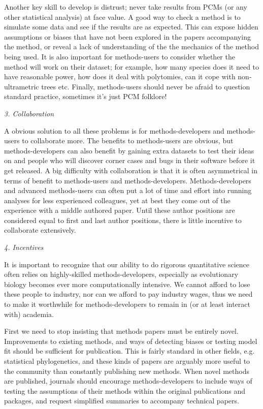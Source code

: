 \documentclass[a4paper,12pt]{article}
\renewcommand{\subsection}[1]{
  \bigskip
  \begin{center}
  \begin{large}
  \normalfont\itshape #1
  \end{large}
  \end{center}
}
\begin{document}
Another key skill to develop is distrust; never take results from PCMs (or any other statistical analysis) at face value. 
A good way to check a method is to simulate some data and see if the results are as expected. 
This can expose hidden assumptions or biases that have not been explored in the papers accompanying the method, or reveal a lack of understanding of the the mechanics of the method being used. 
It is also important for methods-users to consider whether the method will work on their dataset; for example, how many species does it need to have reasonable power, how does it deal with polytomies, can it cope with non-ultrametric trees etc.
Finally, methods-users should never be afraid to question standard practice, sometimes it's just PCM folklore!

\subsection{3. Collaboration}
A obvious solution to all these problems is for methods-developers and methods-users to collaborate more. 
The benefits to methods-users are obvious, but methods-developers can also benefit by gaining extra datasets to test their ideas on and people who will discover corner cases and bugs in their software before it get released. 
A big difficulty with collaboration is that it is often asymmetrical in terms of benefit to methods-users and methods-developers. 
Methods-developers and advanced methods-users can often put a lot of time and effort into running analyses for less experienced colleagues, yet at best they come out of the experience with a middle authored paper. 
Until these author positions are considered equal to first and last author positions, there is little incentive to collaborate extensively.

\subsection{4. Incentives}
It is important to recognize that our ability to do rigorous quantitative science often relies on highly-skilled methods-developers, especially as evolutionary biology becomes ever more computationally intensive. 
We cannot afford to lose these people to industry, nor can we afford to pay industry wages, thus we need to make it worthwhile for methods-developers to remain in (or at least interact with) academia.

First we need to stop insisting that methods papers must be entirely novel. 
Improvements to existing methods, and ways of detecting biases or testing model fit should be sufficient for publication. 
This is fairly standard in other fields, e.g. statistical phylogenetics, and these kinds of papers are arguably more useful to the community than constantly publishing new methods.
When novel methods are published, journals should encourage methods-developers to include ways of testing the assumptions of their methods within the original publications and packages, and request simplified summaries to accompany technical papers.
\end{document}
